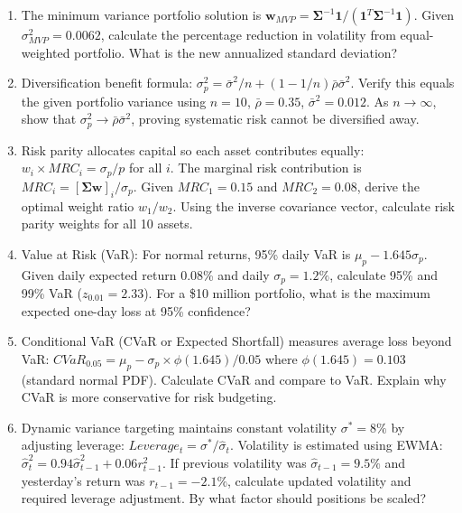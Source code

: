 \documentclass[12pt]{article}
\begin{document}
\begin{enumerate}[label=(\alph*)]
\item The minimum variance portfolio solution is $\mathbf{w}_{MVP} = \boldsymbol{\Sigma}^{-1}\mathbf{1} / (\mathbf{1}^T\boldsymbol{\Sigma}^{-1}\mathbf{1})$. Given $\sigma_{MVP}^2 = 0.0062$, calculate the percentage reduction in volatility from equal-weighted portfolio. What is the new annualized standard deviation?

\item Diversification benefit formula: $\sigma_p^2 = \bar{\sigma}^2/n + (1-1/n)\bar{\rho}\bar{\sigma}^2$. Verify this equals the given portfolio variance using $n=10$, $\bar{\rho} = 0.35$, $\bar{\sigma}^2 = 0.012$. As $n \to \infty$, show that $\sigma_p^2 \to \bar{\rho}\bar{\sigma}^2$, proving systematic risk cannot be diversified away.

\item Risk parity allocates capital so each asset contributes equally: $w_i \times MRC_i = \sigma_p/p$ for all $i$. The marginal risk contribution is $MRC_i = [\boldsymbol{\Sigma}\mathbf{w}]_i/\sigma_p$. Given $MRC_1 = 0.15$ and $MRC_2 = 0.08$, derive the optimal weight ratio $w_1/w_2$. Using the inverse covariance vector, calculate risk parity weights for all 10 assets.

\item Value at Risk (VaR): For normal returns, 95\% daily VaR is $\mu_p - 1.645\sigma_p$. Given daily expected return 0.08\% and daily $\sigma_p = 1.2\%$, calculate 95\% and 99\% VaR ($z_{0.01} = 2.33$). For a \$10 million portfolio, what is the maximum expected one-day loss at 95\% confidence?

\item Conditional VaR (CVaR or Expected Shortfall) measures average loss beyond VaR: $CVaR_{0.05} = \mu_p - \sigma_p \times \phi(1.645)/0.05$ where $\phi(1.645) = 0.103$ (standard normal PDF). Calculate CVaR and compare to VaR. Explain why CVaR is more conservative for risk budgeting.

\item Dynamic variance targeting maintains constant volatility $\sigma^* = 8\%$ by adjusting leverage: $Leverage_t = \sigma^*/\hat{\sigma}_t$. Volatility is estimated using EWMA: $\hat{\sigma}_t^2 = 0.94\hat{\sigma}_{t-1}^2 + 0.06r_{t-1}^2$. If previous volatility was $\hat{\sigma}_{t-1} = 9.5\%$ and yesterday's return was $r_{t-1} = -2.1\%$, calculate updated volatility and required leverage adjustment. By what factor should positions be scaled?
\end{enumerate}
\end{document}
